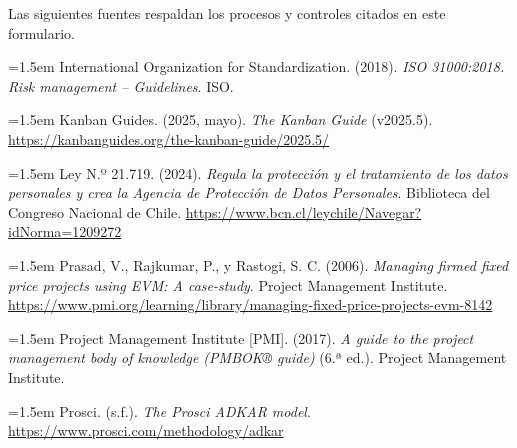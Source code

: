 \documentclass[11pt]{article}
\begin{document}
Las siguientes fuentes respaldan los procesos y controles citados en este formulario.

\noindent\hangindent=1.5em International Organization for Standardization. (2018). \emph{ISO 31000:2018. Risk management -- Guidelines}. ISO.

\noindent\hangindent=1.5em Kanban Guides. (2025, mayo). \emph{The Kanban Guide} (v2025.5). \url{https://kanbanguides.org/the-kanban-guide/2025.5/}

\noindent\hangindent=1.5em Ley N.º 21.719. (2024). \emph{Regula la protección y el tratamiento de los datos personales y crea la Agencia de Protección de Datos Personales}. Biblioteca del Congreso Nacional de Chile. \url{https://www.bcn.cl/leychile/Navegar?idNorma=1209272}

\noindent\hangindent=1.5em Prasad, V., Rajkumar, P., y Rastogi, S. C. (2006). \emph{Managing firmed fixed price projects using EVM: A case-study}. Project Management Institute. \url{https://www.pmi.org/learning/library/managing-fixed-price-projects-evm-8142}

\noindent\hangindent=1.5em Project Management Institute [PMI]. (2017). \emph{A guide to the project management body of knowledge (PMBOK® guide)} (6.ª ed.). Project Management Institute.

\noindent\hangindent=1.5em Prosci. (s.f.). \emph{The Prosci ADKAR model}. \url{https://www.prosci.com/methodology/adkar}

\ossFinalPage
\end{document}
